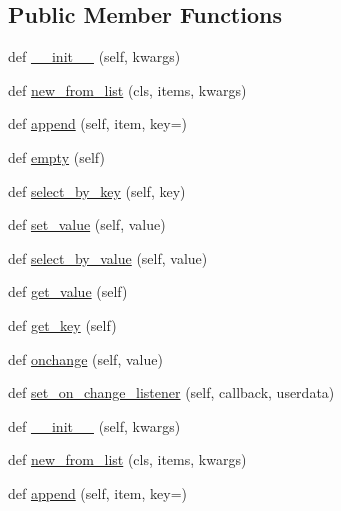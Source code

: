 \subsection*{Public Member Functions}
\begin{DoxyCompactItemize}
\item 
def \hyperlink{classremi_1_1gui_1_1DropDown_a4d64cb3276727de8098e9932869db09c}{\+\_\+\+\_\+init\+\_\+\+\_\+} (self, kwargs)
\item 
def \hyperlink{classremi_1_1gui_1_1DropDown_adb3c979c795d849686e3a33680697768}{new\+\_\+from\+\_\+list} (cls, items, kwargs)
\item 
def \hyperlink{classremi_1_1gui_1_1DropDown_a11d351d78669cfac0e8584f1c434fadc}{append} (self, item, key=\textquotesingle{}\textquotesingle{})
\item 
def \hyperlink{classremi_1_1gui_1_1DropDown_a0d08df5632bb86d7e080a0a16dfed81b}{empty} (self)
\item 
def \hyperlink{classremi_1_1gui_1_1DropDown_ab90bddfa11c58ca1f3dc511e71c208a0}{select\+\_\+by\+\_\+key} (self, key)
\item 
def \hyperlink{classremi_1_1gui_1_1DropDown_a4ae2ce02966ee50469ac41ebdabf69d8}{set\+\_\+value} (self, value)
\item 
def \hyperlink{classremi_1_1gui_1_1DropDown_a0ace4729ed7dcbeb794dd74c4319966b}{select\+\_\+by\+\_\+value} (self, value)
\item 
def \hyperlink{classremi_1_1gui_1_1DropDown_a27a3a7621118ca5a52aeaacc1727863d}{get\+\_\+value} (self)
\item 
def \hyperlink{classremi_1_1gui_1_1DropDown_ac68a8e0482c7bf82e57ca9cfc943be01}{get\+\_\+key} (self)
\item 
def \hyperlink{classremi_1_1gui_1_1DropDown_afc8c3b60e36d41160ca6fe5fb56188c4}{onchange} (self, value)
\item 
def \hyperlink{classremi_1_1gui_1_1DropDown_ae89e13b02debba198e4c8d30852e42e6}{set\+\_\+on\+\_\+change\+\_\+listener} (self, callback, userdata)
\item 
def \hyperlink{classremi_1_1gui_1_1DropDown_a4d64cb3276727de8098e9932869db09c}{\+\_\+\+\_\+init\+\_\+\+\_\+} (self, kwargs)
\item 
def \hyperlink{classremi_1_1gui_1_1DropDown_adb3c979c795d849686e3a33680697768}{new\+\_\+from\+\_\+list} (cls, items, kwargs)
\item 
def \hyperlink{classremi_1_1gui_1_1DropDown_a11d351d78669cfac0e8584f1c434fadc}{append} (self, item, key=\textquotesingle{}\textquotesingle{})
\item 

\end{DoxyCompactItemize}
